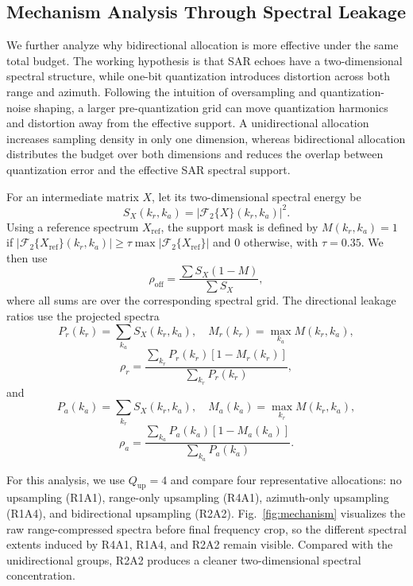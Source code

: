 \documentclass[conference]{IEEEtran}
\begin{document}
\subsection{Mechanism Analysis Through Spectral Leakage}

We further analyze why bidirectional allocation is more effective under the same total budget. The working hypothesis is that SAR echoes have a two-dimensional spectral structure, while one-bit quantization introduces distortion across both range and azimuth. Following the intuition of oversampling and quantization-noise shaping, a larger pre-quantization grid can move quantization harmonics and distortion away from the effective support. A unidirectional allocation increases sampling density in only one dimension, whereas bidirectional allocation distributes the budget over both dimensions and reduces the overlap between quantization error and the effective SAR spectral support.

For an intermediate matrix $X$, let its two-dimensional spectral energy be
\begin{equation}
S_X(k_r,k_a)=|\mathcal{F}_2\{X\}(k_r,k_a)|^2 .
\end{equation}
Using a reference spectrum $X_{\mathrm{ref}}$, the support mask is defined by $M(k_r,k_a)=1$ if $|\mathcal{F}_2\{X_{\mathrm{ref}}\}(k_r,k_a)|\geq \tau \max |\mathcal{F}_2\{X_{\mathrm{ref}}\}|$ and $0$ otherwise, with $\tau=0.35$. We then use
\begin{equation}
\rho_{\mathrm{off}}=\frac{\sum S_X(1-M)}{\sum S_X},
\end{equation}
where all sums are over the corresponding spectral grid. The directional leakage ratios use the projected spectra
\begin{equation}
P_r(k_r)=\sum_{k_a}S_X(k_r,k_a), \quad
M_r(k_r)=\max_{k_a}M(k_r,k_a),
\end{equation}
\begin{equation}
\rho_r=
\frac{\sum_{k_r}P_r(k_r)[1-M_r(k_r)]}{\sum_{k_r}P_r(k_r)},
\end{equation}
and
\begin{equation}
P_a(k_a)=\sum_{k_r}S_X(k_r,k_a), \quad
M_a(k_a)=\max_{k_r}M(k_r,k_a),
\end{equation}
\begin{equation}
\rho_a=
\frac{\sum_{k_a}P_a(k_a)[1-M_a(k_a)]}{\sum_{k_a}P_a(k_a)}.
\end{equation}

For this analysis, we use $Q_{\mathrm{up}}=4$ and compare four representative allocations: no upsampling (R1A1), range-only upsampling (R4A1), azimuth-only upsampling (R1A4), and bidirectional upsampling (R2A2). Fig.~\ref{fig:mechanism} visualizes the raw range-compressed spectra before final frequency crop, so the different spectral extents induced by R4A1, R1A4, and R2A2 remain visible. Compared with the unidirectional groups, R2A2 produces a cleaner two-dimensional spectral concentration.
\end{document}
